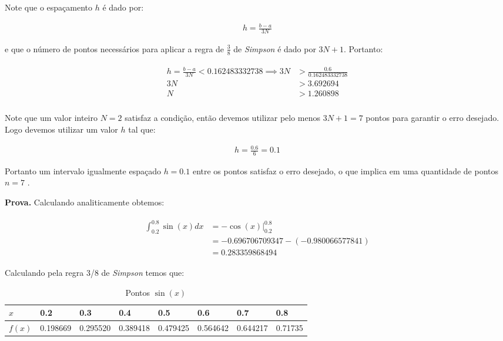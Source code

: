 \documentclass[paper=a4, fontsize=12pt]{scrartcl}
\numberwithin{equation}{section} %
\numberwithin{figure}{section} %
\numberwithin{table}{section} %
\begin{document}
		Note que o espaçamento $h$ é dado por:

		\begin{align*}
			h = \frac{b-a}{3N}
		\end{align*}

		e que o número de pontos necessários para aplicar a regra de $\frac{3}{8}$ de \textit{Simpson} é dado por $3N + 1$. Portanto:

		\begin{align*}
		\begin{split}
			h = \frac{b - a}{3N} < 0.162483332738 \implies 3N &>	\frac{0.6}{0.162483332738}  \\														3N &> 3.692694
			\\														N	&>	1.260898					\\
		\end{split}
		\end{align*}

		Note que um valor inteiro $  N = 2  $ satisfaz a condição, então devemos utilizar pelo menos $3N + 1 = 7$ pontos para garantir o erro desejado. Logo devemos utilizar um valor $h$ tal que:

		\begin{align*}
			h = \frac{0.6}{6} = 0.1
		\end{align*}

		Portanto um intervalo igualmente espaçado $h = 0.1$ entre os pontos satisfaz o erro desejado, o que implica em uma quantidade de pontos $n = 7$ .

		\textbf{Prova.}
		Calculando analiticamente obtemos:

		\begin{align*}
			\begin{split}
				\int_{0.2}^{0.8}\sin(x) dx &= -\cos(x)\Big|_{0.2}^{0.8} \\
				&= -0.696706709347 - (-0.980066577841) \\ &= 0.283359868494
			\end{split}
		\end{align*}

		Calculando pela regra 3/8 de \textit{Simpson} temos que:
 		\begin{table}[H]
 			\def\arraystretch{1.5}
 			\begin{center}
 				\caption{Pontos $\sin(x)$}
 				\label{points_ex10}
 				\begin{tabularx}
 					{\textwidth}{|X|p{1.5cm}|p{1.5cm}|p{1.5cm}|p{1.5cm}|p{1.5cm}|p{1.5cm}|p{1.5cm}|}
 					\hline
 					{$x$} & 0.2 & 0.3 & 0.4 & 0.5 & 0.6 & 0.7 & 0.8 \\
 					\hline
 					{$f{(x)}$} & 0.198669 & 0.295520 & 0.389418 & 0.479425 & 0.564642 & 0.644217 & 0.71735\\
 					\hline
 				\end{tabularx}
 			\end{center}
 		\end{table}
\end{document}
